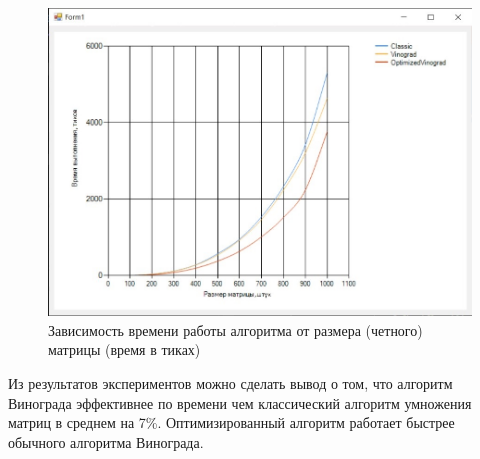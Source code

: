 \captionsetup{justification=centering,singlelinecheck=false}

\begin{figure}[H]
	\centering
	\includegraphics[width=1\linewidth]{"inc/img/Снимок экрана 2022-10-20 014553"}
	\caption{Зависимость времени работы алгоритма от размера (четного) матрицы (время в тиках)}
	\label{fig:even}
\end{figure}

Из результатов экспериментов можно сделать вывод о том, что алгоритм Винограда эффективнее по времени чем классический алгоритм умножения матриц в среднем на 7\%. Оптимизированный алгоритм работает быстрее обычного алгоритма Винограда.

